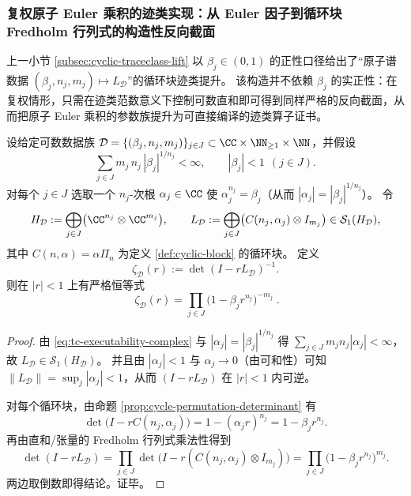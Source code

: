 \subsubsection{复权原子 Euler 乘积的迹类实现：从 Euler 因子到循环块 Fredholm 行列式的构造性反向截面}\label{subsec:cyclic-traceclass-lift-complex}
上一小节 \ref{subsec:cyclic-traceclass-lift} 以 \(\beta_j\in(0,1)\) 的正性口径给出了“原子谱数据 \((\beta_j,n_j,m_j)\mapsto L_{\mathcal D}\)”的循环块迹类提升。
该构造并不依赖 \(\beta_j\) 的实正性：在复权情形，只需在迹类范数意义下控制可数直和即可得到同样严格的反向截面，从而把原子 Euler 乘积的参数族提升为可直接编译的迹类算子证书。

\begin{corollary}\label{cor:cyclic-euler-product-complex-section}
设给定可数数据族 \(\mathcal D=\{(\beta_j,n_j,m_j)\}_{j\in J}\subset \CC\times \NN_{\ge 1}\times \NN\)，并假设
\begin{equation}\label{eq:tc-executability-complex}
\sum_{j\in J} m_j\,n_j\,|\beta_j|^{1/n_j}<\infty,
\qquad
|\beta_j|<1\ \ (j\in J).
\end{equation}
对每个 \(j\in J\) 选取一个 \(n_j\)-次根 \(\alpha_j\in\CC\) 使 \(\alpha_j^{n_j}=\beta_j\)（从而 \(|\alpha_j|=|\beta_j|^{1/n_j}\)）。
令
\[
H_{\mathcal D}:=\bigoplus_{j\in J}\bigl(\CC^{n_j}\otimes \CC^{m_j}\bigr),
\qquad
L_{\mathcal D}:=\bigoplus_{j\in J}\bigl(C(n_j,\alpha_j)\otimes I_{m_j}\bigr)\in \mathcal{S}_1(H_{\mathcal D}),
\]
其中 \(C(n,\alpha)=\alpha\Pi_n\) 为定义 \ref{def:cyclic-block} 的循环块。
定义
\[
\zeta_{\mathcal D}(r):=\det(I-rL_{\mathcal D})^{-1}.
\]
则在 \(|r|<1\) 上有严格恒等式
\[
\boxed{\;
\zeta_{\mathcal D}(r)=\prod_{j\in J}\bigl(1-\beta_j r^{n_j}\bigr)^{-m_j}\; }.
\]
\end{corollary}

\begin{proof}
由 \eqref{eq:tc-executability-complex} 与 \(|\alpha_j|=|\beta_j|^{1/n_j}\) 得
\(
\sum_{j\in J}m_jn_j|\alpha_j|<\infty
\)，故 \(L_{\mathcal D}\in\mathcal{S}_1(H_{\mathcal D})\)。
并且由 \(|\alpha_j|<1\) 与 \(\alpha_j\to 0\)（由可和性）可知 \(\|L_{\mathcal D}\|=\sup_j|\alpha_j|<1\)，从而 \((I-rL_{\mathcal D})\) 在 \(|r|<1\) 内可逆。
\par
对每个循环块，由命题 \ref{prop:cycle-permutation-determinant} 有
\[
\det\bigl(I-rC(n_j,\alpha_j)\bigr)=1-(\alpha_j r)^{n_j}=1-\beta_j r^{n_j}.
\]
再由直和/张量的 Fredholm 行列式乘法性得到
\[
\det(I-rL_{\mathcal D})
=\prod_{j\in J}\det\bigl(I-r(C(n_j,\alpha_j)\otimes I_{m_j})\bigr)
=\prod_{j\in J}\bigl(1-\beta_j r^{n_j}\bigr)^{m_j}.
\]
两边取倒数即得结论。证毕。
\end{proof}

